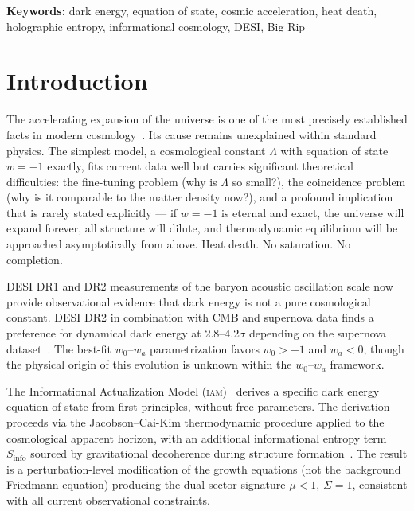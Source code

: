 \documentclass[12pt,letterpaper]{article}
\newcommand{\IAM}{\textsc{iam}}
\begin{document}
\begin{titlepage}
\vspace{1cm}
{\small\noindent\textbf{Keywords:} dark energy, equation of state, cosmic acceleration, heat death, holographic entropy, informational cosmology, DESI, Big Rip\par}

\end{titlepage}


\section{Introduction}

The accelerating expansion of the universe is one of the most precisely established facts in modern cosmology~\citep{Riess1998, Perlmutter1999, PlanckVI2020}. Its cause remains unexplained within standard physics. The simplest model, a cosmological constant $\Lambda$ with equation of state $w = -1$ exactly, fits current data well but carries significant theoretical difficulties: the fine-tuning problem (why is $\Lambda$ so small?), the coincidence problem (why is it comparable to the matter density now?), and a profound implication that is rarely stated explicitly --- if $w = -1$ is eternal and exact, the universe will expand forever, all structure will dilute, and thermodynamic equilibrium will be approached asymptotically from above. Heat death. No saturation. No completion.

DESI DR1 and DR2 measurements of the baryon acoustic oscillation scale now provide observational evidence that dark energy is not a pure cosmological constant. DESI DR2 in combination with CMB and supernova data finds a preference for dynamical dark energy at 2.8--4.2$\sigma$ depending on the supernova dataset~\citep{DESIDR2_2025}. The best-fit $w_0$--$w_a$ parametrization favors $w_0 > -1$ and $w_a < 0$, though the physical origin of this evolution is unknown within the $w_0$--$w_a$ framework.

The Informational Actualization Model (\IAM)~\citep{Mahaffey2026_obs} derives a specific dark energy equation of state from first principles, without free parameters. The derivation proceeds via the Jacobson--Cai-Kim thermodynamic procedure applied to the cosmological apparent horizon, with an additional informational entropy term $S_{\mathrm{info}}$ sourced by gravitational decoherence during structure formation~\citep{Jacobson1995, CaiKim2005}. The result is a perturbation-level modification of the growth equations (not the background Friedmann equation) producing the dual-sector signature $\mu < 1$, $\Sigma = 1$, consistent with all current observational constraints.
\end{document}
